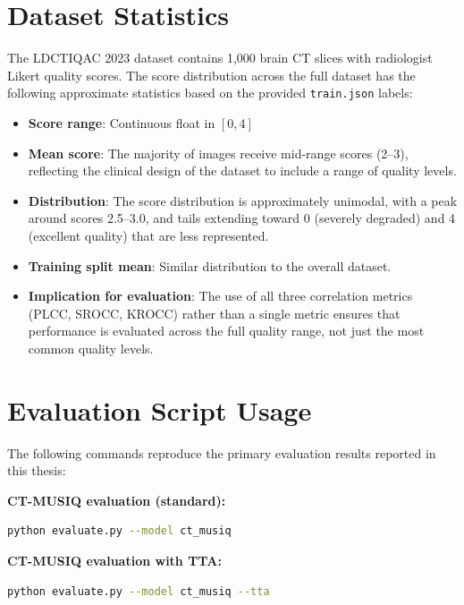 \section{Dataset Statistics}
\label{app:dataset_stats}

The LDCTIQAC 2023 dataset contains 1,000 brain CT slices with radiologist Likert quality
scores. The score distribution across the full dataset has the following approximate
statistics based on the provided \texttt{train.json} labels:

\begin{itemize}
    \item \textbf{Score range}: Continuous float in $[0, 4]$
    \item \textbf{Mean score}: The majority of images receive mid-range scores (2--3),
          reflecting the clinical design of the dataset to include a range of quality levels.
    \item \textbf{Distribution}: The score distribution is approximately unimodal, with
          a peak around scores 2.5--3.0, and tails extending toward 0 (severely degraded)
          and 4 (excellent quality) that are less represented.
    \item \textbf{Training split mean}: Similar distribution to the overall dataset.
    \item \textbf{Implication for evaluation}: The use of all three correlation metrics
          (PLCC, SROCC, KROCC) rather than a single metric ensures that performance is
          evaluated across the full quality range, not just the most common quality levels.
\end{itemize}

\section{Evaluation Script Usage}
\label{app:eval_usage}

The following commands reproduce the primary evaluation results reported in this thesis:

\textbf{CT-MUSIQ evaluation (standard):}
\begin{lstlisting}[language=bash, basicstyle=\ttfamily\small, frame=single]
python evaluate.py --model ct_musiq
\end{lstlisting}

\textbf{CT-MUSIQ evaluation with TTA:}
\begin{lstlisting}[language=bash, basicstyle=\ttfamily\small, frame=single]
python evaluate.py --model ct_musiq --tta
\end{lstlisting}

